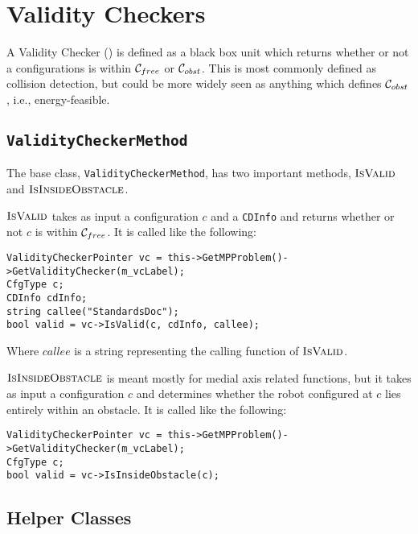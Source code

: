 \chapter{Validity Checkers}

A Validity Checker (\vc) is defined as a black box unit which returns whether or
not a configurations is within $\mathcal{C}_{free}$ or $\mathcal{C}_{obst}$. This is most commonly
defined as collision detection, but could be more widely seen as anything
which defines $\mathcal{C}_{obst}$, i.e., energy-feasible.

\section{\texttt{ValidityCheckerMethod}}

The base class, \texttt{ValidityCheckerMethod}, has two important methods,
$\textsc{IsValid}$ and $\textsc{IsInsideObstacle}$.

$\textsc{IsValid}$ takes as input a configuration $c$ and a \texttt{CDInfo} and
returns whether or not $c$ is within $\mathcal{C}_{free}$. It is called like the following:
\begin{lstlisting}
ValidityCheckerPointer vc = this->GetMPProblem()->GetValidityChecker(m_vcLabel);
CfgType c;
CDInfo cdInfo;
string callee("StandardsDoc");
bool valid = vc->IsValid(c, cdInfo, callee);
\end{lstlisting}
Where $callee$ is a string representing the calling function of
$\textsc{IsValid}$.

$\textsc{IsInsideObstacle}$ is meant mostly for medial axis related functions, but
it takes as input a configuration $c$ and determines whether the robot
configured at $c$ lies entirely within an obstacle. It is called like the
following:
\begin{lstlisting}
ValidityCheckerPointer vc = this->GetMPProblem()->GetValidityChecker(m_vcLabel);
CfgType c;
bool valid = vc->IsInsideObstacle(c);
\end{lstlisting}

\section{Helper Classes}

